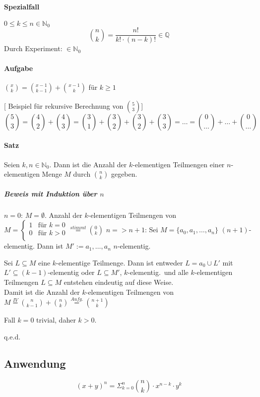 \documentclass[14pt,a4paper]{article}
\begin{document}
   	   \paragraph{Spezialfall} $ 0 \leq k \leq n \in \mathbb{N}_0 $
   		   $$ \binom{n}{k} = \frac{n!}{k! \cdot (n-k)!} \in \mathbb{Q} $$
   		   Durch Experiment: $ \in \mathbb{N}_0 $

   	   \paragraph{Aufgabe}
   		   $ \binom{x}{k} = \binom{x-1}{k-1} + \binom{x-1}{k} $ für $ k \geq 1 $

   		   [ Beispiel für rekursive Berechnung von $\binom{5}{3} $]
   		   $$ \binom{5}{3} = \binom{4}{2} + \binom{4}{3} = \binom{3}{1} + \binom{3}{2} + \binom{3}{2} + \binom{3}{3} = \dots = \binom{0}{\dots} + \dots + \binom{0}{\dots} $$

   	   \paragraph{Satz}
   		   Seien $k,n \in \mathbb{N}_0$. Dann ist die Anzahl der $k$-elementigen Teilmengen einer $n$-elementigen Menge $M$ durch $\binom{n}{k}$ gegeben.

   		   \subparagraph{Beweis mit Induktion über $n$}
   			   $n=0$: $M = \emptyset $. Anzahl der $k$-elementigen Teilmengen von $M = \begin{cases} 1 & \text{für } k = 0 \\ 0 & \text{für } k > 0 \\ \end{cases} \stackrel{stimmt}{=} \binom{0}{k} $
   			   $n => n+1$: Sei $M = \{a_0, a_1, \dots, a_n\}$ $(n+1)$-elementig.
   			   Dann ist $ M' := {a_1, \dots, a_n} $ $n$-elementig.

   			   Sei $ L \subseteq M $ eine $k$-elementige Teilmenge.
   			   Dann ist entweder $ L = {a_0} \cup L' $ mit $ L' \subseteq (k-1)$-elementig oder $ L \subseteq M'$, $k$-elementig.\
   			   und alle $k$-elementigen Teilmengen $L \subseteq M$ entstehen eindeutig auf diese Weise.\\
   			   Damit ist die Anzahl der $k$-elementigen Teilmengen von $M \stackrel{IV}{=} \binom{n}{k-1} + \binom{n}{k} \stackrel{Aufg.}{=} \binom{n+1}{k} $

   			   Fall $k = 0$ trivial, daher $k > 0$.

   			   q.e.d.
   	   \subsection{Anwendung}
   		   $$ ( x + y) ^n = \Sigma_{k=0}^n \binom{n}{k} \cdot x^{n-k} \cdot y^k $$
\end{document}
